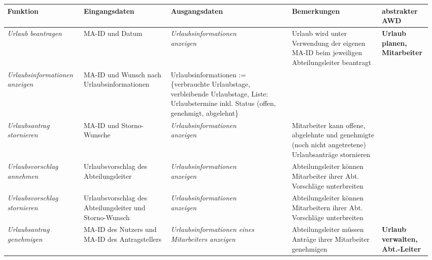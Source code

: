{
\vspace{0,5cm}
\hspace{-3,5cm}
\footnotesize
\begin{tabular}{|p{3cm}|p{4cm}|p{4cm}|p{4cm}|p{2cm}|}
	\hline
		\textbf{Funktion	} &
		\textbf{Eingangsdaten} &
		\textbf{Ausgangsdaten}&
		\textbf{Bemerkungen}	&
		\textbf{abstrakter AWD} \\
	\hline \hline
		\textit{Urlaub beantragen} &
		MA-ID und Datum &
		\textit{Urlaubsinformationen \newline anzeigen} &
		Urlaub wird unter Verwendung der eigenen MA-ID beim jeweiligen Abteilungsleiter beantragt &
		\textbf{Urlaub \newline planen, \newline Mitarbeiter } \\
	\cline{1-4}
		\textit{Urlaubsinformationen anzeigen} &
		MA-ID und Wunsch nach Urlaubsinformationen &
		Urlaubsinformationen := \newline \{verbrauchte Urlaubstage, verbleibende Urlaubstage, Liste: Urlaubstermine inkl. Status (offen, genehmigt, abgelehnt\} &
		&
		\\
	\cline{1-4}
		\textit{Urlaubsantrag \newline stornieren} &
		MA-ID und Storno-Wunsche &
		\textit{Urlaubsinformationen \newline anzeigen} &
		Mitarbeiter kann offene, abgelehnte und genehmigte (noch nicht angetretene) Urlaubsanträge stornieren &
		\\
	\cline{1-4}
		\textit{Urlaubsvorschlag annehmen} &
		Urlaubsvorschlag des Abteilungsleiter &
		 \textit{Urlaubsinformationen \newline anzeigen} &
		Abteilungsleiter können Mitarbeiter ihrer Abt. Vorschläge unterbreiten &
		\\
	\cline{1-4}
		\textit{Urlaubsvorschlag \newline stornieren} &
		Urlaubsvorschlag des Abteilungsleiter und Storno-Wunsch &
		\textit{Urlaubsinformationen \newline anzeigen} &
		Abteilungsleiter können Mitarbeitern ihrer Abt. Vorschläge unterbreiten &
		\\
	\hline \hline
		\textit{Urlaubsantrag \newline genehmigen} &
		MA-ID des Nutzers und MA-ID des Antragstellers &
		\textit{Urlaubsinformationen eines Mitarbeiters an\-zeigen} &
		Abteilungsleiter müssen Anträge ihrer Mitarbeiter genehmigen &
		\textbf{Urlaub \newline verwalten, \newline Abt.-Leiter } \\

\end{tabular}}

